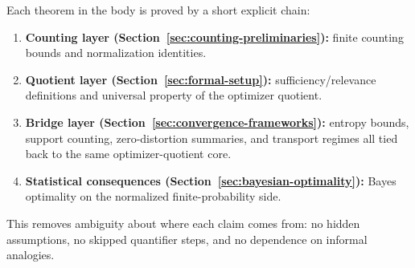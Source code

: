 Each theorem in the body is proved by a short explicit chain:
\begin{enumerate}
\item \textbf{Counting layer (Section~\ref{sec:counting-preliminaries}):} finite counting bounds and normalization identities.
\item \textbf{Quotient layer (Section~\ref{sec:formal-setup}):} sufficiency/relevance definitions and universal property of the optimizer quotient.
\item \textbf{Bridge layer (Section~\ref{sec:convergence-frameworks}):} entropy bounds, support counting, zero-distortion summaries, and transport regimes all tied back to the same optimizer-quotient core.
\item \textbf{Statistical consequences (Section~\ref{sec:bayesian-optimality}):} Bayes optimality on the normalized finite-probability side.
\end{enumerate}

This removes ambiguity about where each claim comes from: no hidden assumptions, no skipped quantifier steps, and no dependence on informal analogies.
